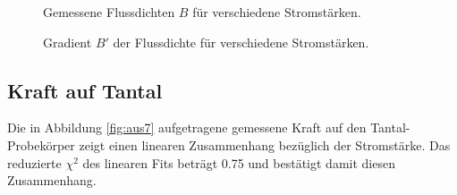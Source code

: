 \documentclass[12pt,a4paper,titlepage,headinclude,bibtotoc]{scrartcl}
\begin{document}
\begin{figure}[h]
\centering
{}
\caption{Gemessene Flussdichten $B$ für verschiedene Stromstärken.}
\label{fig:aus61}
\end{figure}
\begin{figure}[h]
\centering
{}
\caption{Gradient $B'$ der Flussdichte für verschiedene Stromstärken.}
\label{fig:aus62}
\end{figure}
\subsection{Kraft auf Tantal}
Die in Abbildung \ref{fig:aus7} aufgetragene gemessene Kraft auf den Tantal-Probekörper zeigt einen linearen Zusammenhang bezüglich der Stromstärke.
Das reduzierte $\chi^2$ des linearen Fits beträgt 0.75 und bestätigt damit diesen Zusammenhang.
\end{document}
